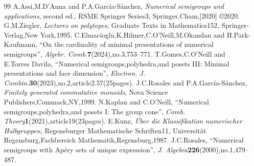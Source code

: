 \documentclass[10pt,a4paper]{amsart}
\theoremstyle{definition}\newtheorem{defi}[thm]{Definition}
\begin{document}
\begin{thebibliography}{99}
 A.Assi,M.D'Anna and P.A.García-Sánchez, \emph{Numerical semigroups and applications}, second ed., RSME Springer Series3, Springer,Cham,[2020] \copyright2020.
 G.M.Ziegler, \emph{Lectures on polytopes}, Graduate Texts in Mathematics152, Springer-Verlag,New York,1995.
 C.Elmacioglu,K.Hilmer,C.O'Neill,M.Okandan and H.Park-Kaufmann, ``On the cardinality of minimal presentations of numerical semigroups'', \emph{Algebr. Comb.}\textbf{7}(2024),no.3,753--771.
 T.Gomes,C.O'Neill and E.Torres Davila, ``Numerical semigroups,polyhedra,and posets III: Minimal presentations and face dimension'', \emph{Electron. J. Combin.}\textbf{30}(2023),no.2,article2.57(25pages).
 J.C.Rosales and P.A.García-Sánchez, \emph{Finitely generated commutative monoids}, Nova Science Publishers,Commack,NY,1999.
 N.Kaplan and C.O'Neill, ``Numerical semigroups,polyhedra,and posets I: The group cone'', \emph{Comb. Theory}\textbf{1}(2021),article19(23pages).
 E.Kunz, \emph{Über die Klassifikation numerischer Halbgruppen}, Regensburger Mathematische Schriften11, Universität Regensburg,Fachbereich Mathematik,Regensburg,1987.
 J.C.Rosales, ``Numerical semigroups with Apéry sets of unique expression'', \emph{J. Algebra}\textbf{226}(2000),no.1,479--487.
\end{thebibliography}
\end{document}
